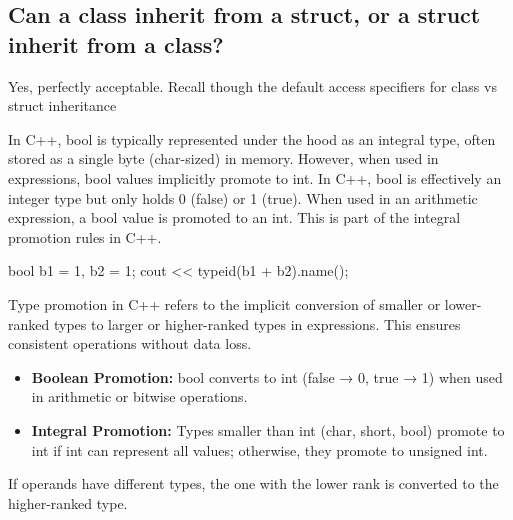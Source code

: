 \documentclass{report}
\begin{document}
    \bigbreak \noindent 
    \subsection{Can a class inherit from a struct, or a struct inherit from a class?}
    \bigbreak \noindent 
    Yes, perfectly acceptable. Recall though the default access specifiers for class vs struct inheritance



    \pagebreak 
    \bigbreak \noindent 
    In C++, bool is typically represented under the hood as an integral type, often stored as a single byte (char-sized) in memory. However, when used in expressions, bool values implicitly promote to int.
    \bigbreak \noindent 
    In C++, bool is effectively an integer type but only holds 0 (false) or 1 (true).
    \bigbreak \noindent 
    When used in an arithmetic expression, a bool value is promoted to an int.
    \bigbreak \noindent 
    This is part of the integral promotion rules in C++.
    \bigbreak \noindent 
    \begin{cppcode}
        bool b1 = 1, b2 = 1;
        cout << typeid(b1 + b2).name();
    \end{cppcode}

    \pagebreak 
    \bigbreak \noindent 
    Type promotion in C++ refers to the implicit conversion of smaller or lower-ranked types to larger or higher-ranked types in expressions. This ensures consistent operations without data loss.
    \begin{itemize}
        \item \textbf{Boolean Promotion:} bool converts to int (false → 0, true → 1) when used in arithmetic or bitwise operations.
        \item \textbf{Integral Promotion:} Types smaller than int (char, short, bool) promote to int if int can represent all values; otherwise, they promote to unsigned int.
    \end{itemize}
    If operands have different types, the one with the lower rank is converted to the higher-ranked type.
    \bigbreak \noindent 
\end{document}
